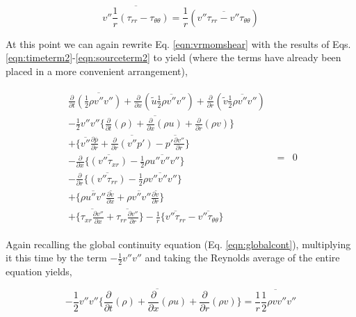 \begin{equation}
	\overline{v''\frac{1}{r}(\tau_{rr} - \tau_{\theta \theta})} = 
	\frac{1}{r}(\overline{v''\tau_{rr} - v''\tau_{\theta \theta}})
\label{eqn:sourceterm2}
\end{equation}

	At this point we can again rewrite Eq. \ref{eqn:vrmomshear} with the results of 
Eqs. \ref{eqn:timeterm2}-\ref{eqn:sourceterm2} to yield (where the terms have already been placed in a more 
convenient arrangement),

\begin{displaymath}
   \begin{array}{ccc}
      \begin{array}{c}
	\frac{\partial}{\partial t}\overline{(\frac{1}{2}\rho v'' v'')}	+ \frac{\partial}{\partial x}
	(\tilde u \overline{\frac{1}{2}\rho v'' v''}) + \frac{\partial}{\partial r}(\tilde v \overline{\frac{1}{2}\rho v'' v''})\\
	-\overline{\frac{1}{2}v''v''\Big\{\frac{\partial}{\partial t}(\rho) + \frac{\partial}{\partial x}(\rho u)
	+ \frac{\partial}{\partial r}(\rho v)\Big\}} \\ 
	+ \Big\{ \overline{v''}\frac{\partial \overline{p}}{\partial r} + \overline{\frac{\partial}{\partial r}(v''p')} 
	- \overline {p'\frac{\partial v''}{\partial r}} \Big\} \\
	-\frac{\partial}{\partial x}\Big\{ \overline{(v''\tau_{xr})} - \frac{1}{2}\overline{\rho u'' v'' v''}\Big\} \\
	-\frac{\partial}{\partial r}\Big\{ \overline{(v''\tau_{rr})} - \frac{1}{2}\overline{\rho v'' v'' v''}\Big\} \\
	+ \Big\{\overline{\rho u'' v''}\frac{\partial \tilde v}{\partial x} +  \overline{\rho v'' v''}
	\frac{\partial \tilde v}{\partial r}  \Big\} \\
	+ \Big\{\overline{\tau_{xr}\frac{\partial v''}{\partial x}} + \overline{\tau_{rr}\frac{\partial v''}{\partial r}}  \Big\}
	-\frac{1}{r}\Big\{\overline{v''\tau_{rr}} -\overline{v''\tau_{\theta \theta}} \Big\}
      \end{array}
   & = & 0
   \end{array}	
\end{displaymath}

	Again recalling the global continuity equation (Eq. \ref{eqn:globalcont}), multiplying it this time by the term
$-\frac{1}{2}v''v''$ and taking the Reynolds average of the entire equation yields,

\begin{displaymath}
	 -\overline{\frac{1}{2}v''v''\Big\{\frac{\partial}{\partial t}(\rho) + \frac{\partial}{\partial x}(\rho u)
	+ \frac{\partial}{\partial r}(\rho v)\Big\}} = \overline{\frac{1}{r}\frac{1}{2} \rho v v'' v''}
\end{displaymath}

